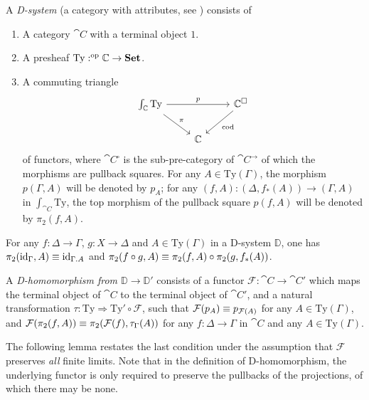 \begin{defn}
A \emph{D-system} (a category with attributes, see \cite{Hofmann_syntax_semantics}) consists of
\begin{enumerate}
\item A category $\cat{C}$ with a terminal object $1$.
\item A presheaf $\mathrm{Ty}:^{\mathrm{op}}{\mathbb{C}}\to\mathbf{Set}$. 
\item A commuting triangle
\begin{equation*}
\begin{tikzcd}
\int_{\cat{C}}\mathrm{Ty} \arrow[rr,"p"] \arrow[dr,"\pi"] & & \cat{C}^\square \arrow[dl,"\mathrm{cod}"] \\
& \cat{C}
\end{tikzcd}
\end{equation*}
of functors, where $\cat{C}^\square$ is the sub-pre-category of $\cat{C}^{\to}$ of
which the morphisms are pullback squares. For any $A\in\mathrm{Ty}(\Gamma)$,
the morphism $p(\Gamma,A)$ will be denoted by $p_A$; for any
$(f,A):(\Delta,f_\ast(A))\to(\Gamma,A)$ in $\int_{\cat{C}}\mathrm{Ty}$, the top
morphism of the pullback square $p(f,A)$ will be denoted by $\pi_2(f,A)$.
\end{enumerate}
\end{defn}

\begin{rmk}
For any $f:\Delta\to\Gamma$, $g:X\to\Delta$ and $A\in\mathrm{Ty}(\Gamma)$ in a
D-system $\mathbb{D}$, one has 
$\pi_2(\catid{\Gamma},A)\jdeq\catid{\ctxext{\Gamma}{A}}$ and
$\pi_2(f\circ g,A)\equiv \pi_2(f,A)\circ\pi_2(g,f_\ast(A))$.
\end{rmk}

\begin{defn}
A \emph{D-homomorphism from $\mathbb{D}\to\mathbb{D}'$} consists of a functor 
$\mathcal{F}:\cat{C}\to\cat{C}'$ which maps the terminal object of
$\cat{C}$ to the terminal object of $\cat{C}'$, and a natural transformation
$\tau:\mathrm{Ty}\Rightarrow\mathrm{Ty}'\circ\mathcal{F}$, such that 
$\mathcal{F}(p_A)\equiv p_{\mathcal{F}(A)}$ for any
$A\in\mathrm{Ty}(\Gamma)$, and $\mathcal{F}(\pi_2(f,A))\equiv
\pi_2(\mathcal{F}(f),\tau_\Gamma(A))$ for any $f:\Delta\to\Gamma$ in $\cat{C}$ and
any $A\in\mathrm{Ty}(\Gamma)$. 
\end{defn}

The following lemma restates the last condition under the assumption that
$\mathcal{F}$ preserves \emph{all} finite limits. Note that
in the definition of D-homomorphism, the underlying functor is only
required to preserve the pullbacks of the projections, of which there may be
none.

